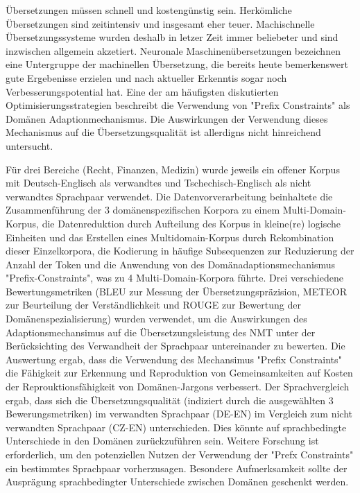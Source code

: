 Übersetzungen müssen schnell und kostengünstig sein.
Herkömliche Übersetzungen sind zeitintensiv und insgesamt eher teuer.
Machischnelle Übersetzungssysteme wurden deshalb in letzer Zeit immer beliebeter und sind inzwischen allgemein akzetiert.
Neuronale Maschinenübersetzungen bezeichnen eine Untergruppe der machinellen Übersetzung, die bereits heute bemerkenswert gute Ergebenisse erzielen und nach aktueller Erkenntis sogar noch Verbesserungspotential hat.
Eine der am häufigsten diskutierten Optimisierungsstrategien beschreibt die Verwendung von "Prefix Constraints" als Domänen Adaptionmechanismus.
Die Auswirkungen der Verwendung dieses Mechanismus auf die Übersetzungsqualität ist allerdigns nicht hinreichend untersucht.

Für drei Bereiche (Recht, Finanzen, Medizin) wurde jeweils ein offener Korpus mit Deutsch-Englisch als verwandtes und Tschechisch-Englisch als nicht verwandtes Sprachpaar verwendet.
Die Datenvorverarbeitung beinhaltete die Zusammenführung der 3 domänenspezifischen Korpora zu einem Multi-Domain-Korpus, die Datenreduktion durch Aufteilung des Korpus in kleine(re) logische Einheiten und das Erstellen eines Multidomain-Korpus durch Rekombination dieser Einzelkorpora, die Kodierung in häufige Subsequenzen zur Reduzierung der Anzahl der Token und die Anwendung von des Domänadaptionsmechanismus "Prefix-Constraints", was zu 4 Multi-Domain-Korpora führte.
Drei verschiedene Bewertungsmetriken (BLEU zur Messung der Übersetzungspräzision, METEOR zur Beurteilung der Verständlichkeit und ROUGE zur Bewertung der Domänenspezialisierung) wurden verwendet, um die Auswirkungen des Adaptionsmechansimus auf die Übersetzungsleistung des NMT unter der Berücksichting des Verwandheit der Sprachpaar untereinander zu bewerten.
Die Auswertung ergab, dass die Verwendung des Mechansimus "Prefix Constraints" die Fähigkeit zur Erkennung und Reproduktion von Gemeinsamkeiten auf Kosten der Reprouktionsfähigkeit von Domänen-Jargons verbessert.
Der Sprachvergleich ergab, dass sich die Übersetzungsqualität (indiziert durch die ausgewählten 3 Bewerungsmetriken) im verwandten Sprachpaar (DE-EN) im Vergleich zum nicht verwandten Sprachpaar (CZ-EN) unterschieden.
Dies könnte auf sprachbedingte Unterschiede in den Domänen zurückzuführen sein.
Weitere Forschung ist erforderlich, um den potenziellen Nutzen der Verwendung der "Prefx Constraints" ein bestimmtes Sprachpaar vorherzusagen.
Besondere Aufmerksamkeit sollte der Ausprägung sprachbedingter Unterschiede zwischen Domänen geschenkt werden.
